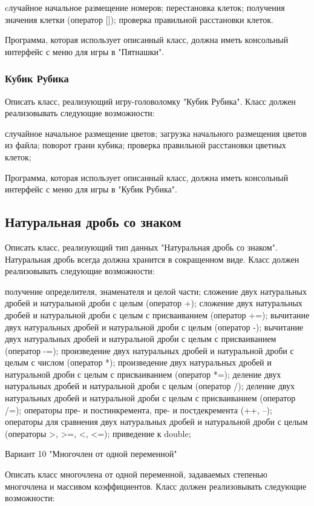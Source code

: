 \documentclass[a4paper,12pt]{article}
\begin{document}
cлучайное начальное размещение номеров;
перестановка клеток;
получения значения клетки (оператор []);
проверка правильной расстановки клеток. 

Программа, которая использует описанный класс, должна иметь консольный интерфейс с меню для игры в "Пятнашки".

\subsubsection{Кубик Рубика}

Описать класс, реализующий игру-головоломку "Кубик Рубика".  Класс
должен реализовывать следующие возможности:

случайное начальное размещение цветов;
загрузка начального размещения цветов из файла;
поворот грани кубика;
проверка правильной расстановки цветных клеток; 

Программа, которая использует описанный класс, должна иметь консольный интерфейс с меню для игры в "Кубик Рубика".

\subsection{Натуральная дробь со знаком}

Описать класс, реализующий тип данных "Натуральная дробь со
знаком". Натуральная дробь всегда должна хранится в сокращенном виде.
Класс должен реализовывать следующие возможности:

получение определителя, знаменателя и целой части;
сложение двух натуральных дробей и натуральной дроби с целым (оператор +);
сложение двух натуральных дробей и натуральной дроби с целым с присваиванием (оператор +=);
вычитание двух натуральных дробей и натуральной дроби с целым (оператор -);
вычитание двух натуральных дробей и натуральной дроби с целым с присваиванием (оператор -=);
произведение двух натуральных дробей и натуральной дроби с целым с числом (оператор *);
произведение двух натуральных дробей и натуральной дроби с целым с присваиванием (оператор *=);
деление двух натуральных дробей и натуральной дроби с целым (оператор /);
деление двух натуральных дробей и натуральной дроби с целым с присваиванием (оператор /=);
операторы пре- и постинкремента, пре- и постдекремента (++, --);
операторы для сравнения двух натуральных дробей и натуральной дроби с целым (операторы >, >=, <, <=);
приведение к double; 

Вариант 10 "Многочлен от одной переменной"

Описать класс многочлена от одной переменной, задаваемых степенью многочлена и массивом коэффициентов. Класс должен реализовывать следующие возможности:
\end{document}
